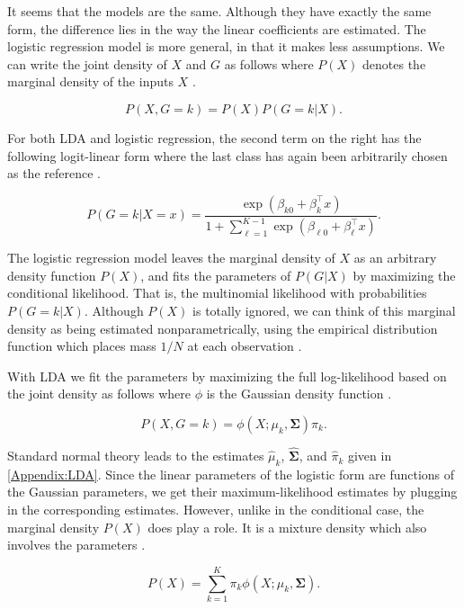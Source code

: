 \documentclass[../../../main.tex]{subfiles}
\begin{document}
It seems that the models are the same. Although they have exactly the same form, the difference lies in the way the linear coefficients are estimated. The logistic regression model is more general, in that it makes less assumptions. We can write the joint density of $X$ and $G$ as follows where $P(X)$ denotes the marginal density of the inputs $X$ \autocite{Hastie2009}.

\begin{equation}
P(X,G=k)=P(X)P(G=k|X).
\end{equation}

For both LDA and logistic regression, the second term on the right has the following logit-linear form where the last class has again been arbitrarily chosen as the reference \autocite{Hastie2009}.

\begin{equation}
P(G=k|X=x) = \frac{\exp(\beta_{k0}+\beta_k^\top x)}{1+\sum_{\ell=1}^{K-1}\exp(\beta_{\ell0}+\beta_\ell^\top x)}.
\end{equation}

The logistic regression model leaves the marginal density of $X$ as an arbitrary density function $P(X)$, and fits the parameters of $P(G|X)$ by maximizing the conditional likelihood. That is, the multinomial likelihood with probabilities $P(G=k|X)$. Although $P(X)$ is totally ignored, we can think of this marginal density as being estimated nonparametrically, using the empirical distribution function which places mass $1/N$ at each observation \autocite{Hastie2009}.

With LDA we fit the parameters by maximizing the full log-likelihood based on the joint density as follows where $\phi$ is the Gaussian density function \autocite{Hastie2009}.

\begin{equation}
P(X,G=k) = \phi(X;\mu_k,\bm{\Sigma})\pi_k.
\end{equation}

Standard normal theory leads to the estimates $\hat{\mu}_k$, $\hat{\bm{\Sigma}}$, and $\hat{\pi}_k$ given in \autoref{Appendix:LDA}. Since the linear parameters of the logistic form are functions of the Gaussian parameters, we get their maximum-likelihood estimates by plugging in the corresponding estimates. However, unlike in the conditional case, the marginal density $P(X)$ does play a role. It is a mixture density which also involves the parameters \autocite{Hastie2009}.

\begin{equation}
P(X) = \sum_{k=1}^{K}\pi_k\phi(X;\mu_k,\bm{\Sigma}).
\end{equation}
\end{document}
